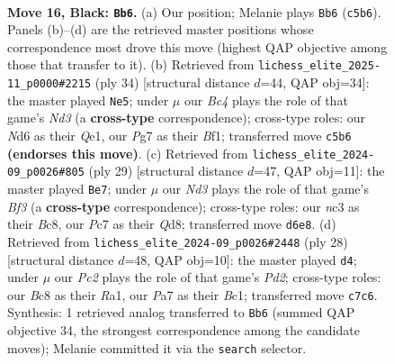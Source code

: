 \documentclass[11pt]{article}
\begin{document}
\clearpage

\begin{figure}[p]\centering
\begin{subfigure}{0.46\textwidth}\centering
\resizebox{\linewidth}{!}{%
\newchessgame
\chessboard[
  setfen={r1bq2k1/pppp1ppp/3n4/2bP4/8/2N1B2P/PPP2PP1/R3QBK1 b - - 4 16},
  showmover=false,
  pgfstyle=straightmove, color=movearrow, markmove={c5-b6}
]}
\caption{}
\end{subfigure}\hfill
\begin{subfigure}{0.46\textwidth}\centering
\resizebox{\linewidth}{!}{%
\newchessgame
\chessboard[
  setfen={r2q2k1/p4ppp/1ppn1b2/3p1b2/3P1B2/2PN4/PP3PPP/R3QBK1 w - - 0 18},
  showmover=false,
  pgfstyle=straightmove, color=movearrow, markmove={d3-e5}
]}
\caption{}
\end{subfigure}
\\[4pt]
\begin{subfigure}{0.46\textwidth}\centering
\resizebox{\linewidth}{!}{%
\newchessgame
\chessboard[
  setfen={r1bqn1k1/1pp2ppp/5b2/p2p4/P2P1B2/2P5/1P1N1PPP/R3QBK1 b - - 1 15},
  showmover=false,
  pgfstyle=straightmove, color=movearrow, markmove={f6-e7}
]}
\caption{}
\end{subfigure}\hfill
\begin{subfigure}{0.46\textwidth}\centering
\resizebox{\linewidth}{!}{%
\newchessgame
\chessboard[
  setfen={r3qbk1/pp1n1ppp/2p5/P2p1b2/8/5B2/1PPP1PPP/R1BQN1K1 w - - 1 15},
  showmover=false,
  pgfstyle=straightmove, color=movearrow, markmove={d2-d4}
]}
\caption{}
\end{subfigure}
\caption{\textbf{Move 16, Black: \texttt{Bb6}.} (a) Our position; Melanie plays \texttt{Bb6} (\texttt{c5b6}). Panels (b)--(d) are the retrieved master positions whose correspondence most drove this move (highest QAP objective among those that transfer to it). (b) Retrieved from \texttt{lichess\_elite\_2025-11\_p0000\#2215} (ply 34) [structural distance $d$=44, QAP obj=34]: the master played \texttt{Ne5}; under $\mu$ our \emph{Bc4} plays the role of that game's \emph{Nd3} (a \textbf{cross-type} correspondence); cross-type roles: our \emph{N}d6 as their \emph{Q}e1, our \emph{P}g7 as their \emph{B}f1; transferred move \texttt{c5b6} \textbf{(endorses this move)}. (c) Retrieved from \texttt{lichess\_elite\_2024-09\_p0026\#805} (ply 29) [structural distance $d$=47, QAP obj=11]: the master played \texttt{Be7}; under $\mu$ our \emph{Nd3} plays the role of that game's \emph{Bf3} (a \textbf{cross-type} correspondence); cross-type roles: our \emph{n}c3 as their \emph{B}c8, our \emph{P}c7 as their \emph{Q}d8; transferred move \texttt{d6e8}. (d) Retrieved from \texttt{lichess\_elite\_2024-09\_p0026\#2448} (ply 28) [structural distance $d$=48, QAP obj=10]: the master played \texttt{d4}; under $\mu$ our \emph{Pc2} plays the role of that game's \emph{Pd2}; cross-type roles: our \emph{B}c8 as their \emph{R}a1, our \emph{P}a7 as their \emph{B}c1; transferred move \texttt{c7c6}. Synthesis: 1 retrieved analog transferred to \texttt{Bb6} (summed QAP objective 34, the strongest correspondence among the candidate moves); Melanie committed it via the \texttt{search} selector.}
\label{fig:thought-m31}
\end{figure}
\end{document}
